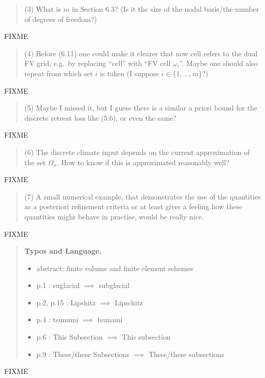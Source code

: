 \documentclass[12pt]{amsart}
\newcommand{\mm}{\medskip \noindent}
\begin{document}
\begin{quote}
\mm (3) What is $m$ in Section 6.3? (Is it the size of the nodal basis/the number of degrees of freedom?)
\end{quote}

FIXME

\begin{quote}
\mm (4) Before (6.11) one could make it clearer that now cell refers to the dual FV grid, e.g.~by replacing ``cell'' with ``FV cell $\omega_i$''.  Maybe one should also repeat from which set $i$ is taken (I suppose $i \in \{1,\dots,m\}$?)
\end{quote}

FIXME

\begin{quote}
\mm (5) Maybe I missed it, but I guess there is a similar a priori bound for the discrete retreat loss like (5.6), or even the same?
\end{quote}

FIXME

\begin{quote}
\mm (6) The discrete climate input depends on the current approximation of the set $\Omega_n$.  How to know if this is approximated reasonably well?
\end{quote}

FIXME

\begin{quote}
\mm (7) A small numerical example, that demonstrates the use of the quantities as a posteriori refinement criteria or at least gives a feeling how these quantities might behave in practise, would be really nice.
\end{quote}

FIXME

\begin{quote}
\textbf{Typos and Language.}

\begin{itemize}
\item abstract: finite volume and finite element schemes
\item p.1 : suglacial $\implies$ subglacial
\item p.2, p.15 : Lipshitz $\implies$ Lipschitz
\item p.4 : tsunumi $\implies$ tsunami
\item p.6 : This Subsection $\implies$ This subsection
\item p.9 : These/these Subsections $\implies$ These/these subsections
\end{itemize}
\end{quote}

FIXME
\end{document}
